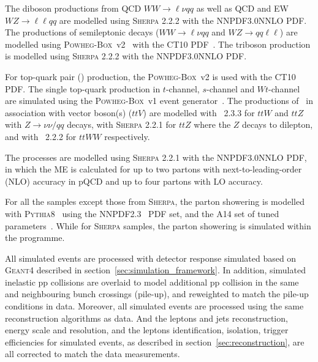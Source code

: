 The diboson productions from QCD $WW \rightarrow \ell \nu qq$ as well as QCD and EW $WZ \rightarrow \ell\ell qq$ are modelled using \textsc{Sherpa} 2.2.2 with the NNPDF3.0NNLO PDF.
The productions of semileptonic decays ($WW \rightarrow \ell\nu qq$ and $WZ \rightarrow qq\ell\ell$) are modelled using \textsc{Powheg-Box}~v2~\cite{Frixione:2007nw} with the CT10 PDF~\cite{Lai:2010vv}.
The triboson production is modelled using \textsc{Sherpa} 2.2.2 with the NNPDF3.0NNLO PDF.

For top-quark pair (\ttbar) production, the \textsc{Powheg-Box}~v2 is used with the CT10 PDF.
The single top-quark production in $t$-channel, $s$-channel and $Wt$-channel are simulated using the \textsc{Powheg-Box}~v1 event generator~\cite{Alioli:2009je,Frederix:2012dh,Re:2010bp}.
The productions of \ttbar~in association with vector boson(s) ($ttV$) are modelled with \MGMCatNLO~2.3.3 for $ttW$ and $ttZ$ with $Z \rightarrow \nu\nu/qq$ decays,
with \textsc{Sherpa} 2.2.1 for $ttZ$ where the $Z$ decays to dilepton,
and with \MGMCatNLO~2.2.2 for $ttWW$ respectively.

The \Zjet processes are modelled using \textsc{Sherpa} 2.2.1 with the NNPDF3.0NNLO PDF, 
in which the ME is calculated for up to two partons with next-to-leading-order (NLO) accuracy in pQCD and up to four partons with LO accuracy.

For all the samples except those from \textsc{Sherpa}, 
the parton showering is modelled with \textsc{Pythia8}~\cite{Sjostrand:2007gs} using the NNPDF2.3~\cite{Ball:2012cx} PDF set,
and the A14 set of tuned parameters~\cite{ATL-PHYS-PUB-2014-021}.
While for \textsc{Sherpa} samples, the parton showering is simulated within the programme.

All simulated events are processed with detector response simulated based on \textsc{Geant4} described in section~\ref{sec:simulation_framework}.
In addition, simulated inelastic pp collisions are overlaid to model additional pp collision in the same and neighbouring bunch crossings (pile-up),
and reweighted to match the pile-up conditions in data.
Moreover, all simulated events are processed using the same reconstruction algorithms as data.
And the leptons and jets reconstruction, energy scale and resolution, and the leptons identification, isolation, trigger efficiencies for simulated events,
as described in section~\ref{sec:reconstruction}, are all corrected to match the data measurements.
